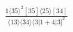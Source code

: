 \documentclass[varwidth, border=5pt]{standalone}
\begin{document}
\begin{my}
$\begin{gathered}
\scriptscriptstyle\frac{1⟨35⟩^2[35]⟨25⟩[34]}{⟨13⟩⟨34⟩⟨3|1+4|3]^2}
\end{gathered}$
\end{my}
\end{document}
